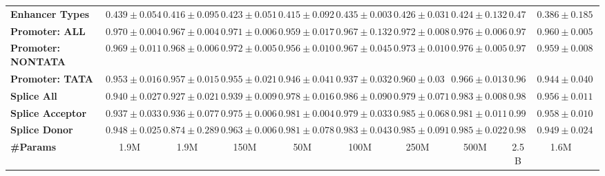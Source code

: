 \begin{table*}
{\begin{tabular}{@{}lcccccccccc@{}}
\textbf{Enhancer Types}   &       $0.439\pm0.054$              &      $0.416\pm0.095$                &           $0.423\pm0.051$             &        $0.415  \pm 0.092$        &       $0.435  \pm 0.003$          &      $0.426 \pm   0.031$           &      $0.424 \pm0.132$           &    $0.474$              &        $0.386\pm0.185$                            \\
\textbf{Promoter: ALL}    &         $0.970\pm0.004$            &          $0.967\pm0.004$            &          $0.971 \pm0.006$              &        $0.959  \pm 0.017$        &      $0.967 \pm 0.132$           &        $0.972 \pm   0.008$         &     $0.976\pm0.006 $            &       $0.974$           &         $0.960\pm0.005$                           \\
\textbf{Promoter: NONTATA}&       $0.969\pm0.011$              &        $0.968\pm0.006$              &           $0.972 \pm0.005$             &      $0.956 \pm   0.010$          &         $0.967 \pm 0.045$        &        $0.973 \pm   0.010$         &      $0.976\pm0.005 $           &      $0.977$            &         $0.959\pm0.008$                           \\
\textbf{Promoter: TATA}   &        $0.953\pm0.016$             &       $0.957\pm0.015$               &            $0.955\pm0.021$            &       $0.946  \pm 0.041$         &        $0.937 \pm 0.032$         &        $0.960 \pm 0.03$         &       $0.966\pm0.013 $          &       $0.964$           &            $0.944\pm0.040$                        \\
\textbf{Splice All}       &        $0.940\pm0.027$             &        $0.927\pm0.021$              &           $0.939\pm0.009$             &      $0.978  \pm 0.016$          &     $ 0.986 \pm 0.090$           &        $0.979 \pm  0.071$         &       $0.983\pm0.008 $          &       $0.983$           &          $0.956 \pm0.011$                          \\
\textbf{Splice Acceptor}  &         $0.937\pm0.033$            &        $0.936\pm0.077$              &        $0.975 \pm0.006$                &       $0.981  \pm 0.004$         &      $ 0.979  \pm 0.033$           &      $0.985 \pm  0.068$           &        $0.981\pm0.011 $         &      $0.990$            &         $0.958\pm0.010$                           \\
\textbf{Splice Donor}     &         $0.948\pm0.025$            &         $0.874\pm0.289$             &       $0.963 \pm0.006$                 &       $0.981  \pm 0.078$         &        $0.983 \pm  0.043$         &       $0.985 \pm  0.091$          &       $0.985\pm0.022 $          &       $0.984$           &        $0.949\pm0.024$                            \\
\textbf{\#Params}         & 1.9M                & 1.9M                 & 150M                   & 50M            & 100M            & 250M            & 500M            & 2.5B             & 1.6M                              \\

\bottomrule
\end{tabular}
}
\end{table*}


